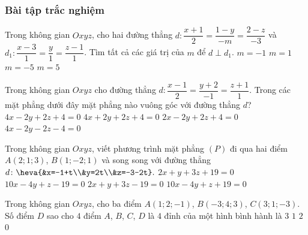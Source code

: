 	\subsubsection{Bài tập trắc nghiệm}
	\setcounter{ex}{0}
	\begin{ex}%
	Trong không gian $Oxyz$, cho hai đường thẳng $d:\dfrac{x+1}{2}=\dfrac{1-y}{-m}=\dfrac{2-z}{-3}$ và $d_{1}:\dfrac{x-3}{1}=\dfrac{y}{1}=\dfrac{z-1}{1}$. Tìm tất cả các giá trị của $m$ để $d\perp d_{1}$.
	\choice
	{$m=-1$}
	{$m=1$}
	{\True $m=-5$}
	{$m=5$}
	\end{ex}
	\begin{ex}%
	Trong không gian $Oxyz$ cho đường thẳng $d\colon \dfrac{x-1}{2}=\dfrac{y+2}{-1}=\dfrac{z+1}{1}.$ Trong các mặt phẳng dưới đây mặt phẳng nào vuông góc với đường thẳng $d$?
	\choice
	{\True $4x-2y+2z+4=0$}
	{$4x+2y+2z+4=0$}
	{$2x-2y+2z+4=0$}
	{$4x-2y-2z-4=0$}
	\end{ex}
	\begin{ex}%
	Trong không gian $Oxyz$, viết phương trình mặt phẳng $(P)$ đi qua hai điểm $A(2;1;3)$, $B(1;-2;1)$ và song song với đường thẳng $d\colon \heva{&x=-1+t\\&y=2t\\&z=-3-2t}.$
	\choice
	{$2x+y+3z+19=0$}
	{\True $10x-4y+z-19=0$}
	{$2x+y+3z-19=0$}
	{$10x-4y+z+19=0$}
	\end{ex}
	\begin{ex} %
	Trong không gian $Oxyz$, cho ba điểm $A(1; 2; -1)$, $B(-3; 4; 3)$, $C(3; 1; -3)$. Số điểm $D$ sao cho $4$ điểm $A$, $B$, $C$, $D$ là $4$ đỉnh của một hình bình hành là
	\choice
	{$3$}
	{$1$}
	{$2$}
	{\True $0$}
	\end{ex}
